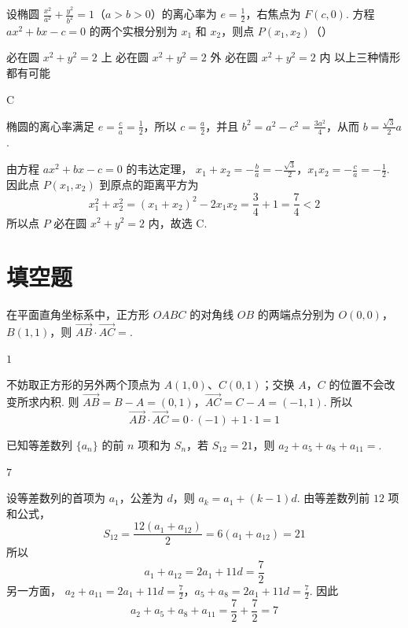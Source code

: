 \begin{problem}
设椭圆 \(\frac{x^2}{a^2} + \frac{y^2}{b^2} = 1\)（\(a > b > 0\)）的离心率为 \(e = \frac{1}{2}\)，右焦点为 \(F(c,0)\). 方程 \(ax^2 + bx - c = 0\) 的两个实根分别为 \(x_1\) 和 \(x_2\)，则点 \(P(x_1, x_2)\)（\quad）

\choices
    {必在圆 \(x^{2} + y^{2} = 2\) 上}
    {必在圆 \(x^{2} + y^{2} = 2\) 外}
    {必在圆 \(x^{2} + y^{2} = 2\) 内}
    {以上三种情形都有可能}

\begin{answer}
C
\end{answer}

\begin{solution}
椭圆的离心率满足 \(e=\frac{c}{a}=\frac{1}{2}\)，所以 \(c=\frac{a}{2}\)，并且
\(b^2=a^2-c^2=\frac{3a^2}{4}\)，从而 \(b=\frac{\sqrt{3}}{2}a\).

由方程 \(ax^2+bx-c=0\) 的韦达定理，
\(x_1+x_2=-\frac{b}{a}=-\frac{\sqrt{3}}{2}\)，\(x_1x_2=-\frac{c}{a}=-\frac{1}{2}\).
因此点 \(P(x_1,x_2)\) 到原点的距离平方为
\[
x_1^2+x_2^2=(x_1+x_2)^2-2x_1x_2=\frac{3}{4}+1=\frac{7}{4}<2
\]
所以点 \(P\) 必在圆 \(x^2+y^2=2\) 内，故选 C.
\end{solution}
\end{problem}

\section{填空题}

\begin{problem}
在平面直角坐标系中，正方形 \(OABC\) 的对角线 \(OB\) 的两端点分别为 \(O(0,0)\)，\(B(1,1)\)，则 \(\overrightarrow{AB} \cdot \overrightarrow{AC} =\)\fillinblank{}.

\begin{answer}
\(1\)
\end{answer}

\begin{solution}
不妨取正方形的另外两个顶点为 \(A(1,0)\)、\(C(0,1)\)；交换 \(A\)，\(C\) 的位置不会改变所求内积. 则
\(\overrightarrow{AB}=B-A=(0,1)\)，\(\overrightarrow{AC}=C-A=(-1,1)\).
所以
\[
\overrightarrow{AB}\cdot\overrightarrow{AC}=0\cdot(-1)+1\cdot1=1
\]
\end{solution}
\end{problem}

\begin{problem}
已知等差数列 \(\{a_{n}\}\) 的前 \(n\) 项和为 \(S_{n}\)，若 \(S_{12} = 21\)，则 \(a_{2} + a_{5} + a_{8} + a_{11} =\)\fillinblank{}.

\begin{answer}
\(7\)
\end{answer}

\begin{solution}
设等差数列的首项为 \(a_1\)，公差为 \(d\)，则 \(a_k=a_1+(k-1)d\). 由等差数列前 \(12\) 项和公式，
\[
S_{12}=\frac{12(a_1+a_{12})}{2}=6(a_1+a_{12})=21
\]
所以
\[
a_1+a_{12}=2a_1+11d=\frac{7}{2}
\]
另一方面，
\(a_2+a_{11}=2a_1+11d=\frac{7}{2}\)，\(a_5+a_8=2a_1+11d=\frac{7}{2}\).
因此
\[
a_2+a_5+a_8+a_{11}=\frac{7}{2}+\frac{7}{2}=7
\]
\end{solution}
\end{problem}


